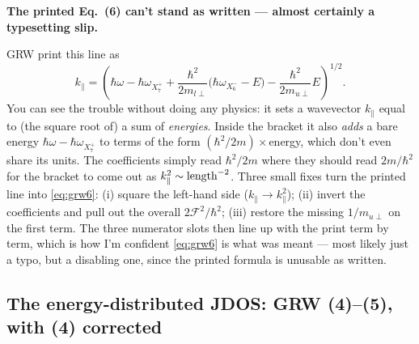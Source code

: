 \documentclass[11pt,a4paper]{article}
\newenvironment{printfix}[1]{%
  \begin{mdframed}[style=printfixstyle]%
  \noindent\textbf{\textcolor{BrickRed}{#1}}\par\smallskip\noindent\ignorespaces}%
  {\end{mdframed}}
\numberwithin{equation}{section}
\newcommand{\hw}{\hbar\omega}
\newcommand{\cF}{\mathcal{F}}
\newcommand{\kpar}{k_{\parallel}}
\newcommand{\wXsix}{\hbar\omega_{X_6^-}}
\newcommand{\wXseven}{\hbar\omega_{X_7^+}}
\begin{document}
\begin{printfix}{The printed Eq.~(6) can't stand as written --- almost
certainly a typesetting slip.}
GRW print this line as
\begin{equation*}
\kpar=\left(\hw-\wXseven
+\frac{\hbar^{2}}{2m_{l\perp}}\bigl(\wXsix-E\bigr)
-\frac{\hbar^{2}}{2m_{u\perp}}E\right)^{1/2}. \tag{6, as printed}
\end{equation*}
You can see the trouble without doing any physics: it sets a
wavevector $\kpar$ equal to (the square root of) a sum of
\emph{energies}. Inside the bracket it also \emph{adds} a bare energy
$\hw-\wXseven$ to terms of the form $(\hbar^2/2m)\times$energy, which
don't even share its units. The coefficients simply read $\hbar^2/2m$
where they should read $2m/\hbar^2$ for the bracket to come out as
$\kpar^2\sim{\rm length}^{-2}$. Three small fixes turn the printed
line into \eqref{eq:grw6}: (i) square the left-hand side
($\kpar\to\kpar^2$); (ii) invert the coefficients and pull out the
overall $2\cF^2/\hbar^2$; (iii) restore the missing $1/m_{u\perp}$ on
the first term. The three numerator slots then line up with the print
term by term, which is how I'm confident \eqref{eq:grw6} is what was
meant --- most likely just a typo, but a disabling one, since the
printed formula is unusable as written.
\end{printfix}

\subsection{The energy-distributed JDOS: GRW (4)--(5), with (4) corrected}
\end{document}
